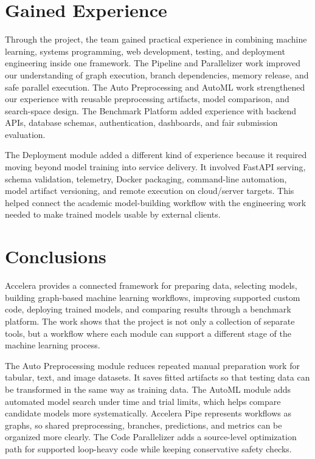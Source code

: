 \documentclass[12pt,a4paper]{report}
\begin{document}
\section{Gained Experience}
Through the project, the team gained practical experience in combining machine
learning, systems programming, web development, testing, and deployment
engineering inside one framework. The Pipeline and Parallelizer work improved
our understanding of graph execution, branch dependencies, memory release, and
safe parallel execution. The Auto Preprocessing and AutoML work strengthened
our experience with reusable preprocessing artifacts, model comparison, and
search-space design. The Benchmark Platform added experience with backend APIs,
database schemas, authentication, dashboards, and fair submission evaluation.

\noindent The Deployment module added a different kind of experience because it
required moving beyond model training into service delivery. It involved
FastAPI serving, schema validation, telemetry, Docker packaging, command-line
automation, model artifact versioning, and remote execution on cloud/server
targets. This helped connect the academic model-building workflow with the
engineering work needed to make trained models usable by external clients.

\section{Conclusions}
Accelera provides a connected framework for preparing data, selecting models,
building graph-based machine learning workflows, improving supported custom
code, deploying trained models, and comparing results through a benchmark
platform. The work shows that the project is not only a collection of separate
tools, but a workflow where each module can support a different stage of the
machine learning process.

\noindent The Auto Preprocessing module reduces repeated manual preparation work
for tabular, text, and image datasets. It saves fitted artifacts so that testing
data can be transformed in the same way as training data. The AutoML module
adds automated model search under time and trial limits, which helps compare
candidate models more systematically. Accelera Pipe represents workflows as
graphs, so shared preprocessing, branches, predictions, and metrics can be
organized more clearly. The Code Parallelizer adds a source-level optimization
path for supported loop-heavy code while keeping conservative safety checks.
\end{document}
